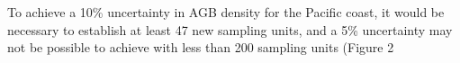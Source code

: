 \documentclass[review, authoryear]{elsarticle}   	%
\DeclareRobustCommand{\Carlos}{\todo[author=Carlos, inline, color=blue!40, size=\small]}
\begin{document}
To achieve a 10\% uncertainty in AGB density for the Pacific coast, it would be necessary to establish at least 47 new sampling units, and a 5\% uncertainty may not be possible to achieve with less than 200 sampling units (Figure 2%



\end{document}
